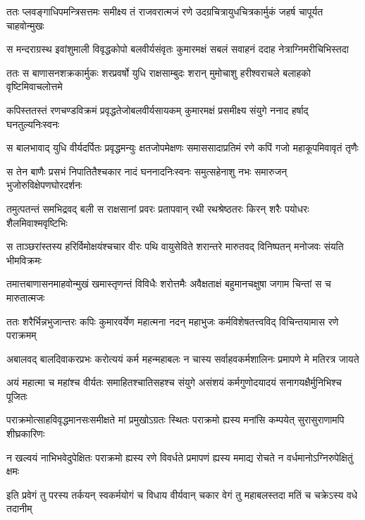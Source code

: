 \twolineshloka
{ततः प्लवङ्गाधिपमन्त्रिसत्तमः समीक्ष्य तं राजवरात्मजं रणे}
{उदग्रचित्रायुधचित्रकार्मुकं जहर्ष चापूर्यत चाहवोन्मुखः} %

\twolineshloka
{स मन्दराग्रस्थ इवांशुमाली विवृद्धकोपो बलवीर्यसंवृतः}
{कुमारमक्षं सबलं सवाहनं ददाह नेत्राग्निमरीचिभिस्तदा} %

\twolineshloka
{ततः स बाणासनशक्रकार्मुकः शरप्रवर्षो युधि राक्षसाम्बुदः}
{शरान् मुमोचाशु हरीश्वराचले बलाहको वृष्टिमिवाचलोत्तमे} %

\twolineshloka
{कपिस्ततस्तं रणचण्डविक्रमं प्रवृद्धतेजोबलवीर्यसायकम्}
{कुमारमक्षं प्रसमीक्ष्य संयुगे ननाद हर्षाद् घनतुल्यनिःस्वनः} %

\twolineshloka
{स बालभावाद् युधि वीर्यदर्पितः प्रवृद्धमन्युः क्षतजोपमेक्षणः}
{समाससादाप्रतिमं रणे कपिं गजो महाकूपमिवावृतं तृणैः} %

\twolineshloka
{स तेन बाणैः प्रसभं निपातितैश्चकार नादं घननादनिःस्वनः}
{समुत्सहेनाशु नभः समारुजन् भुजोरुविक्षेपणघोरदर्शनः} %

\twolineshloka
{तमुत्पतन्तं समभिद्रवद् बली स राक्षसानां प्रवरः प्रतापवान्}
{रथी रथश्रेष्ठतरः किरन् शरैः पयोधरः शैलमिवाश्मवृष्टिभिः} %

\twolineshloka
{स ताञ्छरांस्तस्य हरिर्विमोक्षयंश्चचार वीरः पथि वायुसेविते}
{शरान्तरे मारुतवद् विनिष्पतन् मनोजवः संयति भीमविक्रमः} %

\twolineshloka
{तमात्तबाणासनमाहवोन्मुखं खमास्तृणन्तं विविधैः शरोत्तमैः}
{अवैक्षताक्षं बहुमानचक्षुषा जगाम चिन्तां स च मारुतात्मजः} %

\twolineshloka
{ततः शरैर्भिन्नभुजान्तरः कपिः कुमारवर्येण महात्मना नदन्}
{महाभुजः कर्मविशेषतत्त्वविद् विचिन्तयामास रणे पराक्रमम्} %

\twolineshloka
{अबालवद् बालदिवाकरप्रभः करोत्ययं कर्म महन्महाबलः}
{न चास्य सर्वाहवकर्मशालिनः प्रमापणे मे मतिरत्र जायते} %

\twolineshloka
{अयं महात्मा च महांश्च वीर्यतः समाहितश्चातिसहश्च संयुगे}
{असंशयं कर्मगुणोदयादयं सनागयक्षैर्मुनिभिश्च पूजितः} %

\twolineshloka
{पराक्रमोत्साहविवृद्धमानसःसमीक्षते मां प्रमुखोऽग्रतः स्थितः}
{पराक्रमो ह्यस्य मनांसि कम्पयेत् सुरासुराणामपि शीघ्रकारिणः} %

\twolineshloka
{न खल्वयं नाभिभवेदुपेक्षितः पराक्रमो ह्यस्य रणे विवर्धते}
{प्रमापणं ह्यस्य ममाद्य रोचते न वर्धमानोऽग्निरुपेक्षितुं क्षमः} %

\twolineshloka
{इति प्रवेगं तु परस्य तर्कयन् स्वकर्मयोगं च विधाय वीर्यवान्}
{चकार वेगं तु महाबलस्तदा मतिं च चक्रेऽस्य वधे तदानीम्} %

